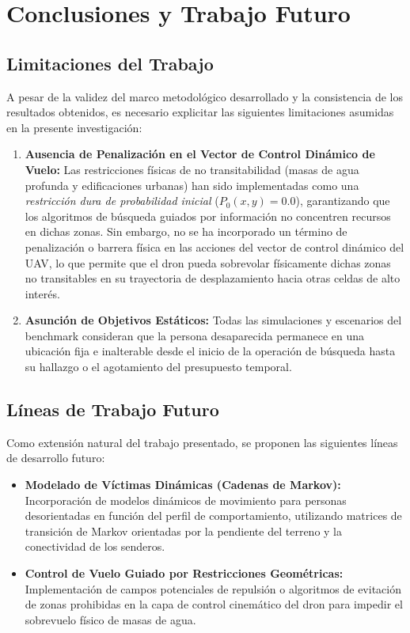 \chapter{Conclusiones y Trabajo Futuro}
\label{cap:conclusiones}

\section{Limitaciones del Trabajo}
A pesar de la validez del marco metodológico desarrollado y la consistencia de los resultados obtenidos, es necesario explicitar las siguientes limitaciones asumidas en la presente investigación:

\begin{enumerate}
    \item \textbf{Ausencia de Penalización en el Vector de Control Dinámico de Vuelo:} 
    Las restricciones físicas de no transitabilidad (masas de agua profunda y edificaciones urbanas) han sido implementadas como una \textit{restricción dura de probabilidad inicial} ($P_0(x,y) = 0.0$), garantizando que los algoritmos de búsqueda guiados por información no concentren recursos en dichas zonas. Sin embargo, no se ha incorporado un término de penalización o barrera física en las acciones del vector de control dinámico del UAV, lo que permite que el dron pueda sobrevolar físicamente dichas zonas no transitables en su trayectoria de desplazamiento hacia otras celdas de alto interés.

    \item \textbf{Asunción de Objetivos Estáticos:} 
    Todas las simulaciones y escenarios del benchmark consideran que la persona desaparecida permanece en una ubicación fija e inalterable desde el inicio de la operación de búsqueda hasta su hallazgo o el agotamiento del presupuesto temporal.
\end{enumerate}

\section{Líneas de Trabajo Futuro}
Como extensión natural del trabajo presentado, se proponen las siguientes líneas de desarrollo futuro:

\begin{itemize}
    \item \textbf{Modelado de Víctimas Dinámicas (Cadenas de Markov):} 
    Incorporación de modelos dinámicos de movimiento para personas desorientadas en función del perfil de comportamiento, utilizando matrices de transición de Markov orientadas por la pendiente del terreno y la conectividad de los senderos.
    \item \textbf{Control de Vuelo Guiado por Restricciones Geométricas:} 
    Implementación de campos potenciales de repulsión o algoritmos de evitación de zonas prohibidas en la capa de control cinemático del dron para impedir el sobrevuelo físico de masas de agua.
\end{itemize}
